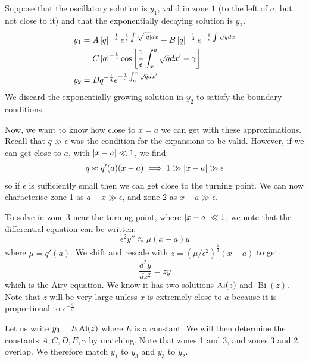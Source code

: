 \documentclass[../Main.tex]{subfiles}
\begin{document}
Suppose that the oscillatory solution is $y_1$, valid in zone $1$ (to the left of $a$, but not close to it) and that the exponentially decaying solution is $y_2$.
\begin{align*}
    y_1 &= A \left|q\right|^{-\frac14} e^{\frac1\epsilon \int \sqrt{\left|q\right|} dx} + B\left|q\right|^{-\frac14} e^{-\frac1\epsilon \int\sqrt{q} dx} \\
    &= C\left|q\right|^{-\frac14} \cos\left[\frac1\epsilon \int_x^a \sqrt{q} dx' - \gamma\right] \\
    y_2 &= D q^{-\frac14} e^{-\frac1\epsilon \int_a^x \sqrt{q} dx'}
\end{align*}
We discard the exponentially growing solution in $y_2$ to satisfy the boundary conditions.

Now, we want to know how close to $x = a$ we can get with these approximations. Recall that $q \gg \epsilon$ was the condition for the expansions to be valid. However, if we can get close to $a$, with $\left|x-a\right| \ll 1$, we find:
\begin{equation*}
    q \approx q'(a)(x - a) \implies 1 \gg \left|x-a\right| \gg \epsilon
\end{equation*}
so if $\epsilon$ is sufficiently small then we can get close to the turning point. We can now characterise zone 1 as $a - x \gg \epsilon$, and zone 2 as $x - a \gg \epsilon$.

To solve in zone 3 near the turning point, where $\left|x-a\right| \ll 1$, we note that the differential equation can be written:
\begin{equation*}
    \epsilon^2 y'' \approx \mu(x-a) y
\end{equation*}
where $\mu = q'(a)$. We shift and rescale with $z = (\mu / \epsilon^2)^{\frac13} (x-a)$ to get:
\begin{equation*}
    \frac{d^{2}y}{dz^{2}} = zy
\end{equation*}
which is the Airy equation. We know it has two solutions $\operatorname{Ai}(z)$ and $\operatorname{Bi}(z)$. Note that $z$ will be very large unless $x$ is extremely close to $a$ because it is proportional to $\epsilon^{-\frac23}$.

Let us write $y_3 = E \operatorname{Ai}(z)$ where $E$ is a constant. We will then determine the constants $A, C, D, E, \gamma$ by matching. Note that zones 1 and 3, and zones 3 and 2, overlap. We therefore match $y_1$ to $y_3$ and $y_3$ to $y_2$.
\end{document}
